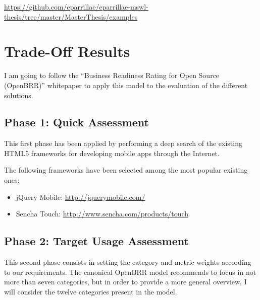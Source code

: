 \documentclass[a4paper,12pt]{book}
\begin{document}
\url{https://github.com/eparrillae/eparrillae-mswl-thesis/tree/master/MasterThesis/examples}



\chapter{Trade-Off Results}
\label{chap:results}

I am going to follow the ``Business Readiness Rating for Open Source
(OpenBRR)'' whitepaper\cite{OpenBRRWhitepaper} to apply this model to the
evaluation of the different solutions.

\section{Phase 1: Quick Assessment}
\label{sec:phase1}
This first phase has been applied by performing a deep search of the existing HTML5 frameworks for developing mobile apps through the Internet.



The following frameworks have been selected among the most popular existing ones:

\begin{itemize}
 \item jQuery Mobile: \url{http://jquerymobile.com/}
 \item Sencha Touch: \url{http://www.sencha.com/products/touch}
\end{itemize}


\section{Phase 2: Target Usage Assessment}
\label{sec:phase2}
This second phase consists in setting the category and metric weights according to our requirements. The canonical OpenBRR model recommends to focus in not more than seven categories, but in order to provide a more general overview, I will consider the twelve categories present in the model.
\end{document}
